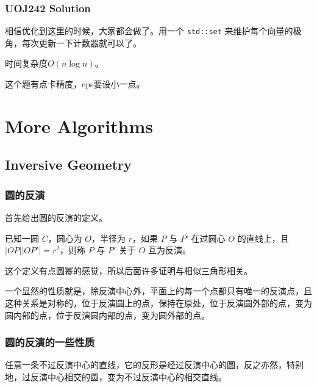 \documentclass[10pt]{beamer}
\begin{document}
\begin{CJK}{UTF8}{gkai}
\begin{spacing}{1.2}
\begin{frame}
		\end{frame}
		\begin{frame}
			\frametitle{UOJ242 Solution}

			相信优化到这里的时候，大家都会做了。用一个 \texttt{std::set} 来维护每个向量的极角，每次更新一下计数器就可以了。 \pause

			时间复杂度$O(n \log n)$。 \pause

			这个题有点卡精度，eps要设小一点。

		\end{frame}
		\section{More Algorithms}
		\subsection{Inversive Geometry}
		\begin{frame}
			\frametitle{圆的反演}
			
			首先给出圆的反演的定义。

			已知一圆 $C$，圆心为 $O$，半径为 $r$，如果 $P$ 与 $P’$ 在过圆心 $O$ 的直线上，且$|OP||OP'| = r^2$，则称 $P$ 与 $P'$ 关于 $O$ 互为反演。 \pause

			这个定义有点圆幂的感觉，所以后面许多证明与相似三角形相关。 \pause

			一个显然的性质就是，除反演中心外，平面上的每一个点都只有唯一的反演点，且这种关系是对称的，位于反演圆上的点，保持在原处，位于反演圆外部的点，变为圆内部的点，位于反演圆内部的点，变为圆外部的点。

		\end{frame}
		\begin{frame}
			\frametitle{圆的反演的一些性质}

			任意一条不过反演中心的直线，它的反形是经过反演中心的圆，反之亦然，特别地，过反演中心相交的圆，变为不过反演中心的相交直线。 \pause


\end{frame}
\end{spacing}
\end{CJK}
\end{document}
